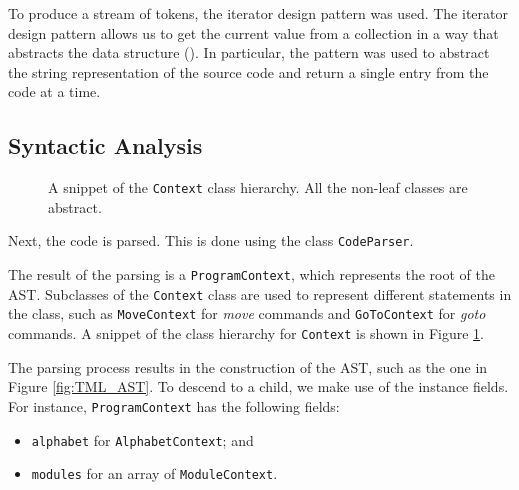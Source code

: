 To produce a stream of tokens, the iterator design pattern was used. The iterator design pattern allows us to get the current value from a collection in a way that abstracts the data structure (\cite{gamma1995design}). In particular, the pattern was used to abstract the string representation of the source code and return a single entry from the code at a time. 

\subsection{Syntactic Analysis}
\begin{figure}[htb]
    \centering
    \caption{A snippet of the \texttt{Context} class hierarchy. All the non-leaf classes are abstract.}
    \label{fig:context_hierarchy}
\end{figure}

Next, the code is parsed. This is done using the class \texttt{CodeParser}. 

The result of the parsing is a \texttt{ProgramContext}, which represents the root of the AST. Subclasses of the \texttt{Context} class are used to represent different statements in the class, such as \texttt{MoveContext} for \textit{move} commands and \texttt{GoToContext} for \textit{goto} commands. A snippet of the class hierarchy for \texttt{Context} is shown in Figure \ref{fig:context_hierarchy}.

The parsing process results in the construction of the AST, such as the one in Figure \ref{fig:TML_AST}. To descend to a child, we make use of the instance fields. For instance, \texttt{ProgramContext} has the following fields:
\begin{itemize}
    \item \texttt{alphabet} for \texttt{AlphabetContext}; and
    \item \texttt{modules} for an array of \texttt{ModuleContext}.
\end{itemize}

